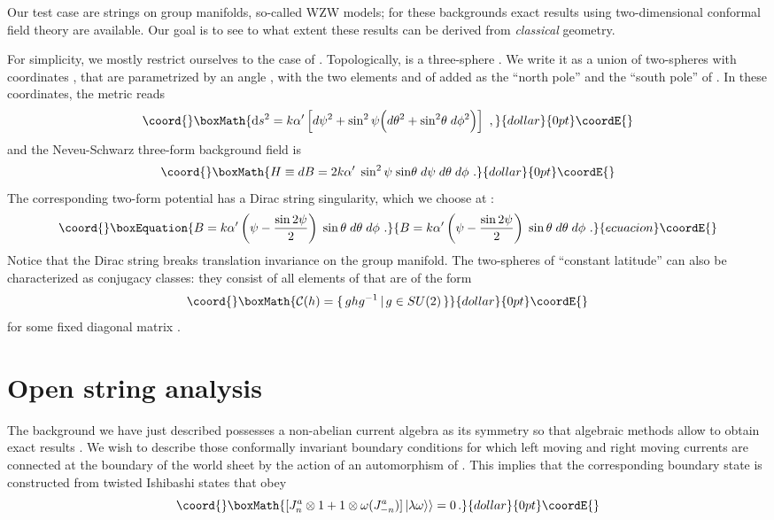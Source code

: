 \documentclass[a4paper,12pt]{article} \usepackage{amssymb,amsfonts,latexsym}
\begin{document}
Our test case are strings on group manifolds, so-called WZW models;
for these backgrounds exact results using two-dimensional conformal
field theory are available. Our goal is to see to what extent these results 
can be derived from {\em classical} geometry. 

For simplicity, we mostly restrict ourselves to the case of \coordHE{}. 
Topologically, \coordHE{} is a three-sphere \coordHE{}. We write it as a union of 
two-spheres with coordinates \myHighlight{$0\leq\theta\leq\pi$}\coordHE{}, \coordHE{} that are 
parametrized by an angle \coordHE{}, with the two elements \coordHE{} and 
\coordHE{} of \coordHE{} added as the ``north pole'' and the ``south pole'' of 
\coordHE{}. In these coordinates, the metric reads
$$\coord{}\boxMath{ \rmd s^2 = k\alpha^\prime \left[ d\psi^2 + \sin^2\psi \Bigl( d\theta^2 +
{\rm sin}^2\theta\;  d\phi^2 \Bigr)\right]\ , }{dollar}{0pt}\coordE{}$$
and the Neveu-Schwarz three-form  background field is 
$$\coord{}\boxMath{ H  \equiv {dB} = {2k\alpha^\prime}\; \sin^2\psi\;
{\rm sin}\theta\; d\psi\; d\theta\; d\phi\ . }{dollar}{0pt}\coordE{}$$
The corresponding two-form potential has a Dirac string singularity,
which we choose at \myHighlight{$\psi=\pi$}\coordHE{}:
\begin{equation}\coord{}\boxEquation{ B =  k\alpha^\prime
\left( \psi - {\sin2\psi\over 2}\right)\;
\sin\theta\; d\theta\; d\phi \ . \label B }{ B =  k\alpha^\prime
\left( \psi - {\sin2\psi\over 2}\right)\;
\sin\theta\; d\theta\; d\phi \ . \label B }{ecuacion}\coordE{}\end{equation}
Notice that the Dirac string breaks translation invariance on the group
manifold. The two-spheres of ``constant latitude'' can also be characterized as
conjugacy classes: they consist of all elements of \coordHE{} that are
of the form 
$$\coord{}\boxMath{ \calc (h) = \{ \, g h g^{-1} \,|\, g\in SU(2) \,\} }{dollar}{0pt}\coordE{}$$
for some fixed diagonal matrix \coordHE{}.

\section{Open string analysis}

The background we have just described possesses a non-abelian current algebra
as its symmetry so that algebraic methods allow to obtain exact results 
\cite{fffs}. We wish to describe those
conformally invariant boundary conditions for which left moving and right
moving currents are connected at the boundary of the world sheet by the
action of an automorphism \myHighlight{$\omega$}\coordHE{} of \coordHE{}. This implies that the corresponding
boundary state \myHighlight{$|\omega,\alpha\rangle$}\coordHE{} is constructed from twisted 
Ishibashi states \myHighlight{$|\lambda,\omega\rangle\rangle\in\calh_\lambda\otimes
\calh_{\lambda^+}$}\coordHE{} that obey
$$\coord{}\boxMath{ [J^a_n \otimes 1 + 1\otimes \omega(J^a_{-n}) ] \,
|\lambda\omega\rangle\rangle = 0 \, . }{dollar}{0pt}\coordE{}$$
\end{document}
